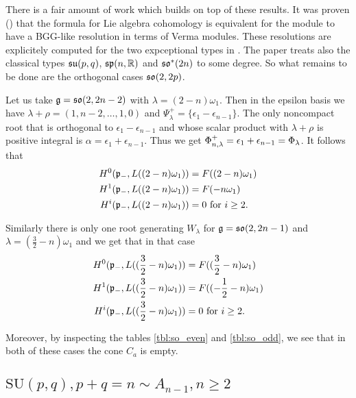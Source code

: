 There is a fair amount of work which builds on top of these results. It was proven (\cite{enright_hilbert_2004,boe_kostant_2009}) that the formula for Lie algebra cohomology is equivalent for the module to have a BGG-like resolution in terms of Verma modules. These resolutions are explicitely computed for the two expceptional types in \cite{enright_resolutions_2004}. The paper \cite{enright_hilbert_2004} treats also the classical types $\mathfrak{su}(p,q)$, $\mathfrak{sp}(n,\mathbb{R})$ and $\mathfrak{so}^*(2n)$ to some degree. So what remains to be done are the orthogonal cases $\mathfrak{so}(2,2p)$. 

\begin{example} 
 Let us take $\mathfrak{g} = \mathfrak{so}(2,2n-2)$ with $\lambda = (2-n)\omega_1$. Then in the epsilon basis we have $\lambda + \rho = (1,n-2,\ldots,1,0)$ and $\Psi_\lambda^+ = \{ \epsilon_1 - \epsilon_{n-1}\}$. The only noncompact root that is orthogonal to $\epsilon_1 -  \epsilon_{n-1}$ and whose scalar product with $\lambda + \rho$ is positive integral is $\alpha = \epsilon_1 + \epsilon_{n-1}$. Thus we get $\Phi_{n,\lambda}^+ = \epsilon_1 + \epsilon_{n-1} = \Phi_\lambda$. It follows that
\begin{align*}
 H^0(\mathfrak{p}_-,L((2-n)\omega_1)) &= F((2-n)\omega_1)\\
 H^1(\mathfrak{p}_-,L((2-n)\omega_1)) &= F(-n\omega_1)\\
 H^i(\mathfrak{p}_-,L((2-n)\omega_1)) &= 0 \text{ for } i\geq 2.
\end{align*} 

Similarly there is only one root generating $W_\lambda$ for $\mathfrak{g} = \mathfrak{so}(2,2n-1)$ and $\lambda = (\frac{3}{2} - n)\omega_1$ and we get that in that case
\begin{align*}
 H^0(\mathfrak{p}_-,L((\frac{3}{2}-n)\omega_1)) &= F((\frac{3}{2}-n)\omega_1)\\
 H^1(\mathfrak{p}_-,L((\frac{3}{2}-n)\omega_1)) &= F((-\frac{1}{2}-n)\omega_1)\\
 H^i(\mathfrak{p}_-,L((\frac{3}{2}-n)\omega_1)) &= 0 \text{ for } i\geq 2.
\end{align*}

Moreover, by inspecting the tables \ref{tbl:so_even} and \ref{tbl:so_odd}, we see that in both of these cases the cone $C_a$ is empty.
\end{example}


\clearpage

\subsection[SU(p,q)]{$\mathrm{SU}(p,q), p+q=n \sim A_{n-1}, n \geq 2$}\label{sec:su}

